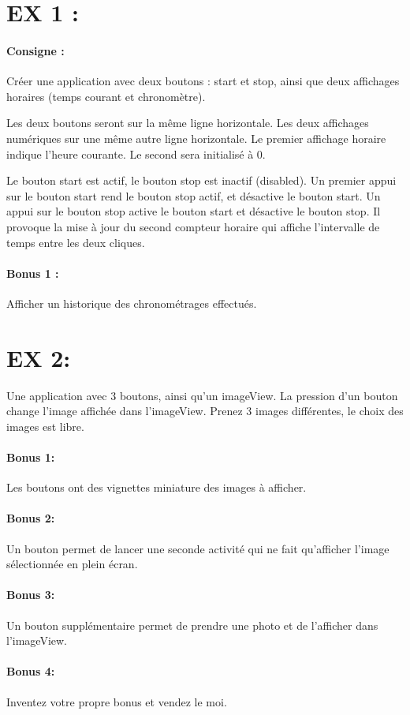 \documentclass{article}
\begin{document}
\section{EX 1 :} 

\paragraph{Consigne : } Créer une application avec deux boutons : start et stop, ainsi que deux affichages horaires (temps courant et chronomètre).

Les deux boutons seront sur la même ligne horizontale. Les deux affichages numériques sur une même autre ligne horizontale.
Le premier affichage horaire indique l'heure courante. Le second sera initialisé à 0.

Le bouton start est actif, le bouton stop est inactif (disabled). Un premier appui sur le bouton start rend le bouton stop actif, et désactive le bouton start. Un appui sur le bouton stop active le bouton start et désactive le bouton stop. Il provoque la mise à jour du second compteur horaire qui affiche l'intervalle de temps entre les deux cliques.

\paragraph{Bonus 1 :} Afficher un historique des chronométrages effectués.

\section{EX 2:}
Une application avec 3 boutons, ainsi qu'un imageView. La pression d'un bouton change l'image affichée dans l'imageView. Prenez 3 images différentes, le choix des images est libre.


\paragraph{Bonus 1:} Les boutons ont des vignettes miniature des images à afficher.

\paragraph{Bonus 2:} Un bouton permet de lancer une seconde activité qui ne fait qu'afficher l'image sélectionnée en plein écran.

\paragraph{Bonus 3:} Un bouton supplémentaire permet de prendre une photo et de l'afficher dans l'imageView.

\paragraph{Bonus 4:} Inventez votre propre bonus et vendez le moi.
\end{document}
